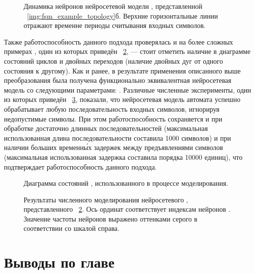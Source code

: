 \begin{figure}[ht]
    \caption{Динамика нейронов  нейросетевой модели , представленной \onfigure~\ref{img:fsm_example_topology}б. Верхние горизонтальные линии отражают временне периоды считывания входных символов.} 
    \label{img:fsm_example_dynamic}  
\end{figure}

Также работоспособность данного подхода проверялась и на более сложных примерах , один из которых приведён \onfigure~\ref{img:fsm_model_topology}, --- стоит отметить наличие в диаграмме состояний циклов и двойных переходов (наличие двойных дуг от одного состояния к другому). Как и ранее, в результате применения описанного выше преобразования была получена функционально эквивалентная нейросетевая модель со следующими параметрами: . Различные численные эксперименты, один из которых приведён \onfigure~\ref{img:fsm_model_dynamic}, показали, что нейросетевая модель автомата успешно обрабатывает любую последовательность входных символов, игнорируя недопустимые символы. При этом работоспособность сохраняется и при обработке достаточно длинных последовательностей (максимальная использованная длина последовательности составила 1000 символов) и при наличии больших временн\'{ы}х задержек между предъявлениями символов (максимальная использованная задержка составила порядка 10000 единиц), что подтверждает работоспособность данного подхода.

\begin{figure}[ht]
    \caption{Диаграмма состояний , использованного в процессе моделирования.}
    \label{img:fsm_model_topology}  
\end{figure}

\begin{figure}[ht]
    \caption{Результаты численного моделирования нейросетевого , представленного \onfigure~\ref{img:fsm_model_topology}. Ось ординат соответствует индексам нейронов . Значение частоты нейронов выражено оттенками серого в соответствии со шкалой справа.} 
    \label{img:fsm_model_dynamic}  
\end{figure}

\section{Выводы по главе \thechapter} \label{section:neuron_concls}



